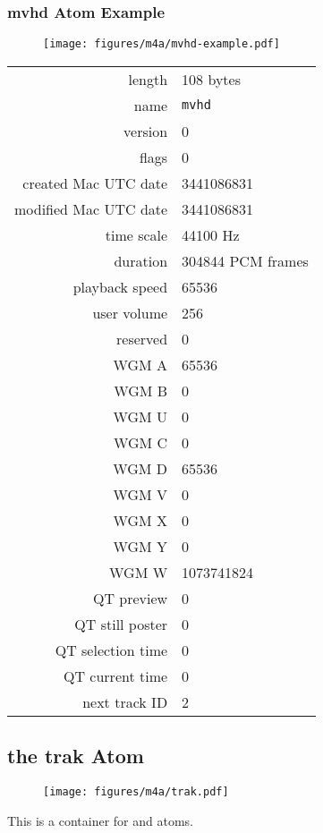 \subsubsection{mvhd Atom Example}
\begin{figure}[h]
  \texttt{[image: figures/m4a/mvhd-example.pdf]}
\end{figure}
\par
\noindent
\begin{tabular}{rl}
  \textsf{length} & 108 bytes \\
  \textsf{name} & \texttt{mvhd} \\
  \textsf{version} & 0 \\
  \textsf{flags} & 0 \\
  \textsf{created Mac UTC date} & 3441086831 \\
  \textsf{modified Mac UTC date} & 3441086831 \\
  \textsf{time scale} & 44100 Hz \\
  \textsf{duration} & 304844 PCM frames \\
  \textsf{playback speed} & 65536 \\
  \textsf{user volume} & 256 \\
  \textsf{reserved} & 0 \\
  \textsf{WGM A} & 65536 \\
  \textsf{WGM B} & 0 \\
  \textsf{WGM U} & 0 \\
  \textsf{WGM C} & 0 \\
  \textsf{WGM D} & 65536 \\
  \textsf{WGM V} & 0 \\
  \textsf{WGM X} & 0 \\
  \textsf{WGM Y} & 0 \\
  \textsf{WGM W} & 1073741824 \\
  \textsf{QT preview} & 0 \\
  \textsf{QT still poster} & 0 \\
  \textsf{QT selection time} & 0 \\
  \textsf{QT current time} & 0 \\
  \textsf{next track ID} & 2 \\
\end{tabular}

\clearpage

\subsection{the trak Atom}
\begin{figure}[h]
  \texttt{[image: figures/m4a/trak.pdf]}
\end{figure}
\par
\noindent
This is a container for  and  atoms.


